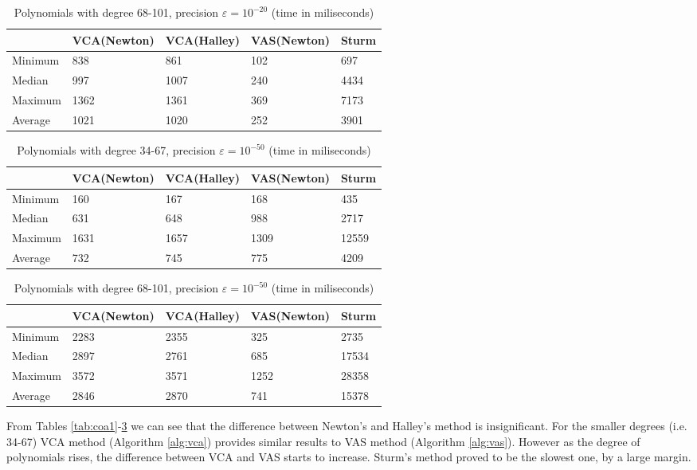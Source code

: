 \documentclass[
  digital, %
  notable,   %
  nolof,     %
  nolot,     %
	final, %
]{fithesis3}
\begin{document}
\begin{table}
  \begin{tabular*}{\textwidth}{lllll}
    \toprule
     & VCA(Newton) & VCA(Halley) & VAS(Newton) & Sturm \\
    \midrule
			Minimum & 838 & 861 & 102 & 697 \\
			Median & 997 & 1007 & 240 & 4434 \\
			Maximum & 1362 & 1361 & 369 & 7173 \\
			Average & 1021 & 1020 & 252 & 3901 \\
    \bottomrule
  \end{tabular*}
  \caption{Polynomials with degree 68-101, precision $\varepsilon = 10^{-20}$ (time in miliseconds)}
  \label{tab:coa2}
\end{table}

\begin{table}
  \begin{tabular*}{\textwidth}{lllll}
    \toprule
     & VCA(Newton) & VCA(Halley) & VAS(Newton) & Sturm \\
    \midrule
			Minimum & 160 & 167 & 168 & 435 \\
			Median & 631 & 648 & 988 & 2717 \\
			Maximum & 1631 & 1657 & 1309 & 12559 \\
			Average & 732 & 745 & 775 & 4209 \\
    \bottomrule
  \end{tabular*}
  \caption{Polynomials with degree 34-67, precision $\varepsilon = 10^{-50}$ (time in miliseconds)}
  \label{tab:coa3}
\end{table}

\begin{table}
  \begin{tabular*}{\textwidth}{lllll}
    \toprule
     & VCA(Newton) & VCA(Halley) & VAS(Newton) & Sturm \\
    \midrule
			Minimum & 2283 & 2355 & 325 & 2735 \\
			Median & 2897 & 2761 & 685 & 17534 \\
			Maximum & 3572 & 3571 & 1252 & 28358 \\
			Average & 2846 & 2870 & 741 & 15378 \\
    \bottomrule
  \end{tabular*}
  \caption{Polynomials with degree 68-101, precision $\varepsilon = 10^{-50}$ (time in miliseconds)}
  \label{tab:coa4}
\end{table}

\FloatBarrier
From Tables \ref{tab:coa1}-\ref{tab:coa4} we can see that the difference between Newton's and Halley's method is insignificant. For the smaller degrees (i.e. 34-67) VCA method (Algorithm \ref{alg:vca}) provides similar results to VAS method (Algorithm \ref{alg:vas}). However as the degree of polynomials rises, the difference between VCA and VAS starts to increase. Sturm's method proved to be the slowest one, by a large margin.
\end{document}
